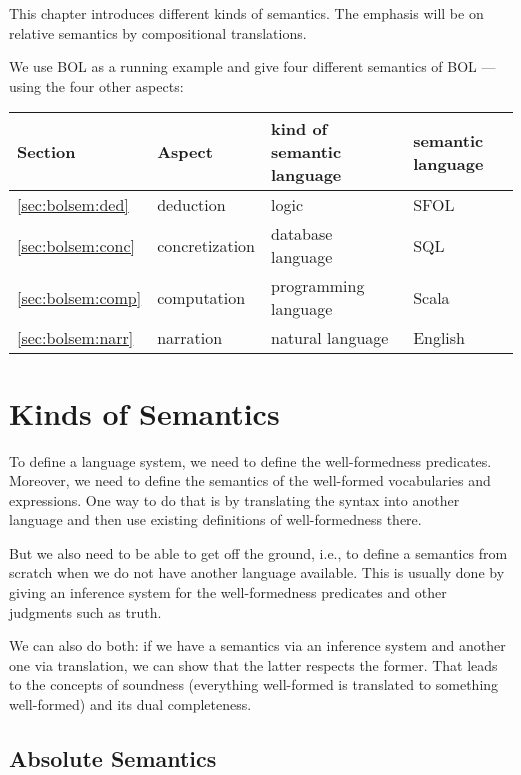 This chapter introduces different kinds of semantics.
The emphasis will be on relative semantics by compositional translations.

We use BOL as a running example and give four different semantics of BOL --- using the four other aspects:
\begin{center}
\begin{tabular}{llll}
Section & Aspect & kind of semantic language & semantic language\\
\hline
\ref{sec:bolsem:ded} & deduction & logic & SFOL \\
\ref{sec:bolsem:conc} & concretization & database language & SQL \\
\ref{sec:bolsem:comp} & computation & programming language & Scala \\
\ref{sec:bolsem:narr} & narration & natural language & English \\
\end{tabular}
\end{center}


\section{Kinds of Semantics}

To define a language system, we need to define the well-formedness predicates.
Moreover, we need to define the semantics of the well-formed vocabularies and expressions.
One way to do that is by translating the syntax into another language and then use existing definitions of well-formedness there.

But we also need to be able to get off the ground, i.e., to define a semantics from scratch when we do not have another language available.
This is usually done by giving an inference system for the well-formedness predicates and other judgments such as truth.

We can also do both: if we have a semantics via an inference system and another one via translation, we can show that the latter respects the former.
That leads to the concepts of soundness (everything well-formed is translated to something well-formed) and its dual completeness.

\subsection{Absolute Semantics}

